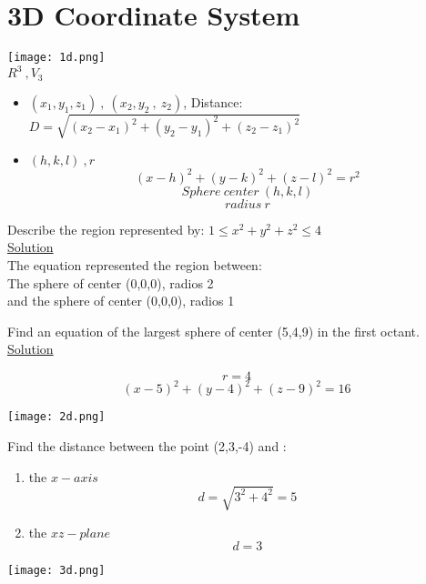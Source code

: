 \section*{3D Coordinate System}
\begin{center}
    \texttt{[image: 1d.png]}\\
{\large\color{smalt(darkpowderblue)} $R^3~,V_3$}
\end{center}
\begin{itemize}
    \item $(x_1,y_1,z_1)~,~(x_2,y_2~,~z_2)$, Distance:\\
    $D=\sqrt{(x_2-x_1)^2+(y_2-y_1)^2+(z_2-z_1)^2}$
    \item $(h,k,l)~,r$
    $$(x-h)^2+(y-k)^2+(z-l)^2=r^2$$
    $$Sphere~center~(h,k,l)$$
    $$radius~r$$
\end{itemize}
\noindent{\color{smalt(darkpowderblue)}\rule{\linewidth}{.2mm}}
\begin{example}
Describe the region represented by: $1\leq x^2+y^2+z^2\leq 4$\\
{\color{smalt(darkpowderblue)}\underline{Solution}}\\
The equation represented the region between:\\
The sphere of center (0,0,0), radios 2\\
and the sphere of center (0,0,0), radios 1
\end{example}
\begin{example}
Find an equation of the largest sphere of center (5,4,9) in the first octant.\\
{\color{smalt(darkpowderblue)}\underline{Solution}}\\
\begin{minipage}{0.5\textwidth}
$$r=4$$
$$(x-5)^2+(y-4)^2+(z-9)^2=16$$
\end{minipage}
\begin{minipage}{0.5\textwidth}
\texttt{[image: 2d.png]}
\end{minipage}
\end{example}
\begin{example}
Find the distance between the point (2,3,-4) and :\\
\begin{minipage}{0.5\textwidth}
\begin{enumerate}
    \item the $x-axis$
    $$d=\sqrt{3^2+4^2}=5$$
    \item the $xz-plane$
    $$d=3$$
\end{enumerate}
\end{minipage}
\begin{minipage}{0.5\textwidth}
\texttt{[image: 3d.png]}
\end{minipage}
\end{example}

